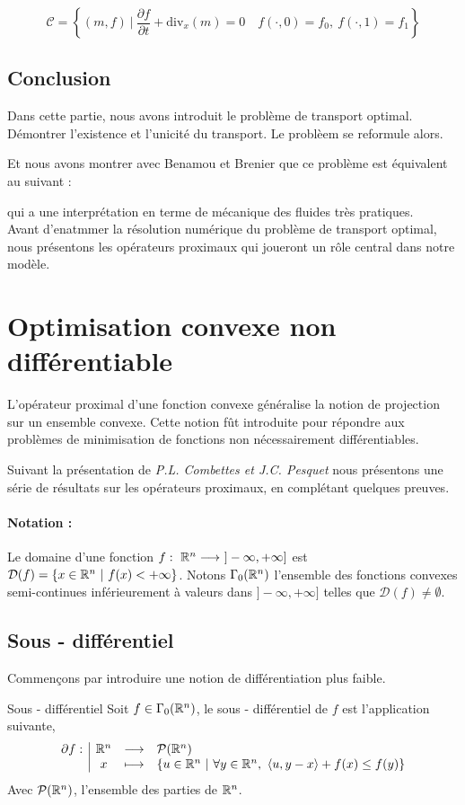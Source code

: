 \documentclass[a4paper,12pt]{article}
\renewcommand{\div}{\text{div}}
\begin{document}
\begin{equation}
\tag{C}
\mathcal{C}=\left\{(m,f)\ |\ \frac{\partial f}{\partial t} + \div_x(m)=0\quad f(\cdot,0)=f_0,\ f(\cdot,1)=f_1\right\}
\label{eq:constraint}
\end{equation}
\subsection{Conclusion}
Dans cette partie, nous avons introduit le problème de transport optimal. Démontrer l'existence et l'unicité du transport. 
Le problèem se reformule alors. 

Et nous avons montrer avec Benamou et Brenier que ce problème est équivalent au suivant : 

qui a une interprétation en terme de mécanique des fluides très pratiques. \\

Avant d'enatmmer la résolution numérique du problème de transport optimal, nous présentons les opérateurs proximaux qui joueront un rôle central dans notre modèle. 

\newpage
\section{Optimisation convexe non différentiable}
\label{sec:prox}
L'opérateur proximal d'une fonction convexe généralise la notion de projection sur un ensemble convexe. Cette notion fût introduite pour répondre aux problèmes de minimisation de fonctions non nécessairement différentiables. 

Suivant la présentation de \emph{P.L. Combettes \emph{et} J.C. Pesquet} \cite{combettes} nous présentons une série de résultats sur les opérateurs proximaux, en complétant quelques preuves.
\paragraph{Notation :}Le domaine d'une fonction $f:\ \RR^n\longrightarrow\ ]-\infty,+\infty]$ est $\mathcal{D}(f) = \{ x\in\mathbb{R}^n\ |\ f(x) < +\infty \} $. Notons $\Gamma_0(\mathbb{R}^n)$ l'ensemble des fonctions convexes semi-continues inférieurement à valeurs dans $]-\infty,+\infty]$ telles que $\mathcal{D}(f) \neq \emptyset$. 
\subsection{Sous - différentiel}
Commençons par introduire une notion de différentiation plus faible. 
\begin{definition}{Sous - différentiel}
Soit $f\in\Gamma_0(\mathbb{R}^n)$, le sous - différentiel de $f$ est l'application suivante,
$$
\begin{array}[t]{l|ccl} \partial f: & \mathbb{R}^n & \longrightarrow & \mathcal{P}(\mathbb{R}^n) \\ & x & \longmapsto & \left\{ u\in\mathbb{R}^n\ |\ \forall y\in\mathbb{R}^n,\ \langle u,y-x\rangle +f(x)\leq f(y) \right\} \end{array}
$$ 
Avec $\mathcal{P}(\mathbb{R}^n)$, l'ensemble des parties de $\mathbb{R}^n$.
\end{definition}
\end{document}
